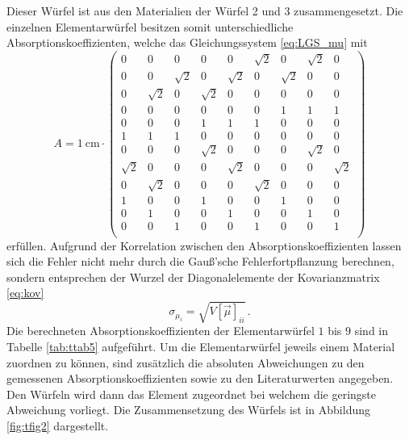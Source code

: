 Dieser Würfel ist aus den Materialien der Würfel 2 und 3 zusammengesetzt.
Die einzelnen Elementarwürfel besitzen somit unterschiedliche Absorptionskoeffizienten, welche das Gleichungssystem \eqref{eq:LGS_mu} mit 
\begin{equation}
    A = \SI{1}{\cm}\cdot 
    \begin{pmatrix}
        0 & 0 & 0 & 0 & 0 & \sqrt{2} & 0 & \sqrt{2} & 0 \\
        0 & 0 & \sqrt{2} & 0 & \sqrt{2} & 0 & \sqrt{2} & 0 & 0 \\
        0 & \sqrt{2} & 0 & \sqrt{2} & 0 & 0 & 0 & 0 & 0 \\
        0 & 0 & 0 & 0 & 0 & 0 & 1 & 1 & 1 \\
        0 & 0 & 0 & 1 & 1 & 1 & 0 & 0 & 0 \\
        1 & 1 & 1 & 0 & 0 & 0 & 0 & 0 & 0 \\
        0 & 0 & 0 & \sqrt{2} & 0 & 0 & 0  & \sqrt{2} & 0 \\
        \sqrt{2} & 0 & 0 & 0 & \sqrt{2} & 0 & 0 & 0 & \sqrt{2} \\
        0 & \sqrt{2} & 0 & 0 & 0  & \sqrt{2} & 0 & 0 & 0\\
        1 & 0 & 0 & 1 & 0 & 0 & 1 & 0 & 0 \\
        0 & 1 & 0 & 0 & 1 & 0 & 0 & 1 & 0 \\
        0 & 0 & 1 & 0 & 0 & 1 & 0 & 0 & 1 \\
      \end{pmatrix}
\end{equation}
erfüllen.
Aufgrund der Korrelation zwischen den Absorptionskoeffizienten lassen sich die Fehler nicht mehr durch die Gauß'sche Fehlerfortpflanzung berechnen, sondern entsprechen der Wurzel der Diagonalelemente der Kovarianzmatrix \eqref{eq:kov}
\begin{equation}
    \sigma_{\mu_i} = \sqrt{V[\vec{\mu}]_{ii}} \, .
\end{equation}
Die berechneten Absorptionskoeffizienten der Elementarwürfel $1$ bis $9$ sind in Tabelle \ref{tab:ttab5} aufgeführt.
Um die Elementarwürfel jeweils einem Material zuordnen zu können, sind zusätzlich die absoluten Abweichungen zu den gemessenen Absorptionskoeffizienten sowie zu den Literaturwerten angegeben.
Den Würfeln wird dann das Element zugeordnet bei welchem die geringste Abweichung vorliegt.
Die Zusammensetzung des Würfels ist in Abbildung \ref{fig:tfig2} dargestellt.

